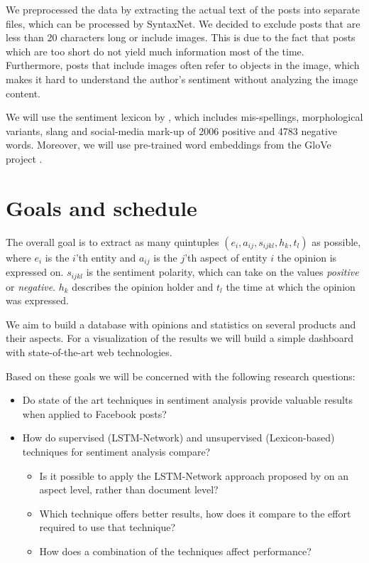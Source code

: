 \documentclass[10pt,a4paper]{article}
\begin{document}
	We preprocessed the data by extracting the actual text of the posts into separate files, which can be processed by SyntaxNet. We decided to exclude posts that are less than 20 characters long or include images. This is due to the fact that posts which are too short do not yield much information most of the time. Furthermore, posts that include images often refer to objects in the image, which makes it hard to understand the author's sentiment without analyzing the image content.
	
	We will use the sentiment lexicon by \cite{Hu:2004:MSC:1014052.1014073}, which includes mis-spellings, morphological variants, slang and social-media mark-up of 2006 positive and 4783 negative words. Moreover, we will use pre-trained word embeddings from the GloVe project \cite{pennington2014glove}.

	\section{Goals and schedule}
	The overall goal is to extract as many quintuples $(e_i, a_{ij}, s_{ijkl}, h_k, t_l)$ as possible, where $e_i$ is the $i$'th entity and $a_{ij}$ is the $j$'th aspect of entity $i$ the opinion is expressed on. $s_{ijkl}$ is the sentiment polarity, which can take on the values \textit{positive} or \textit{negative}. $h_k$ describes the opinion holder and $t_l$ the time at which the opinion was expressed.
	
	We aim to build a database with opinions and statistics on several products and their aspects. For a visualization of the results we will build a simple dashboard with state-of-the-art web technologies.

	Based on these goals we will be concerned with the following research questions:

	\begin{itemize}
	\item Do state of the art techniques in sentiment analysis provide valuable results when applied to Facebook posts?
	\item How do supervised (LSTM-Network) and unsupervised (Lexicon-based) techniques for sentiment analysis compare?
		\begin{itemize}
		\item Is it possible to apply the LSTM-Network approach proposed by \cite{hongsentiment} on an aspect level, rather than document level?
		\item Which technique offers better results, how does it compare to the effort required to use that technique?
		\item How does a combination of the techniques affect performance?
		\end{itemize}
	\end{itemize}
	
\end{document}
